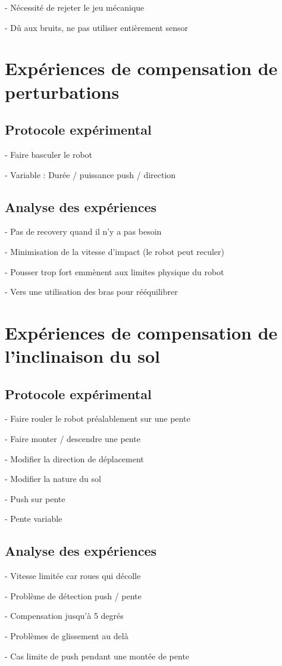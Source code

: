 			- Nécessité de rejeter le jeu mécanique
			
			- Dû aux bruits, ne pas utiliser entièrement sensor
		
	\section{Expériences de compensation de perturbations}
		\subsection{Protocole expérimental}
		
			- Faire basculer le robot
			
			- Variable : Durée / puissance push / direction
			
		\subsection{Analyse des expériences}
		
			- Pas de recovery quand il n'y a pas besoin
			
			- Minimisation de la vitesse d'impact (le robot peut reculer)
		
			- Pousser trop fort emmènent aux limites physique du robot
			
			- Vers une utilisation des bras pour rééquilibrer
		
		
	\section{Expériences de compensation de l'inclinaison du sol}
		\subsection{Protocole expérimental}
		
			- Faire rouler le robot préalablement sur une pente
			
			- Faire monter / descendre une pente
			
			- Modifier la direction de déplacement
			
			- Modifier la nature du sol
			
			- Push sur pente
			
			- Pente variable
		
		\subsection{Analyse des expériences}
		
			- Vitesse limitée car roues qui décolle
			
			- Problème de détection push / pente
			
			- Compensation jusqu'à 5 degrés
			
			- Problèmes de glissement au delà
			
			- Cas limite de push pendant une montée de pente
		